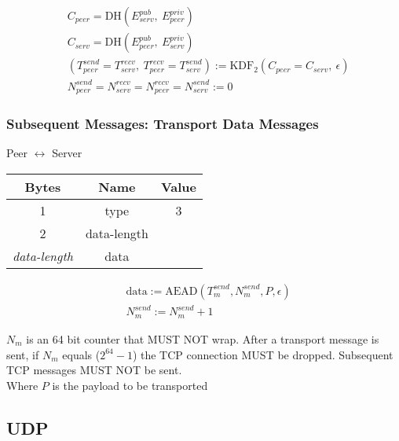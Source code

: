 \documentclass{article}
\begin{document}
    \begin{align*}
        & C_{peer} = \text{DH}(E_{serv}^{pub},\ E_{peer}^{priv})\\
        & C_{serv} = \text{DH}(E_{peer}^{pub},\ E_{serv}^{priv})\\
        & (T_{peer}^{send} = T_{serv}^{recv},\ T_{peer}^{recv} = T_{serv}^{send}) := \text{KDF}_2(C_{peer} = C_{serv},
        \ \epsilon) \\
        & N_{peer}^{send} = N_{serv}^{recv} = N_{peer}^{recv} = N_{serv}^{send} := 0
    \end{align*}

    \subsubsection{Subsequent Messages: Transport Data Messages}

    \begin{center}
        Peer $\leftrightarrow$ Server\\
        \begin{tabular}{|c|c|c|}
            \hline
            \textbf{Bytes}     & \textbf{Name} & \textbf{Value} \\
            \hline
            1                  & type          & 3              \\
            \hline
            2                  & data-length   &                \\
            \hline
            \emph{data-length} & data          &                \\
            \hline
        \end{tabular}
    \end{center}

    \begin{align*}
        & \text{data} := \text{AEAD}(T_{m}^{send}, N_{m}^{send}, P, \epsilon) \\
        & N_{m}^{send} := N_{m}^{send} + 1
    \end{align*}

    $N_{m}$ is an 64 bit counter that MUST NOT wrap. After a transport message is sent, if $N_{m}$ equals
    ($2^{64}-1$) the TCP connection MUST be dropped. Subsequent TCP messages MUST NOT be sent. \\

    Where $P$ is the payload to be transported

    \subsection{UDP}
\end{document}
